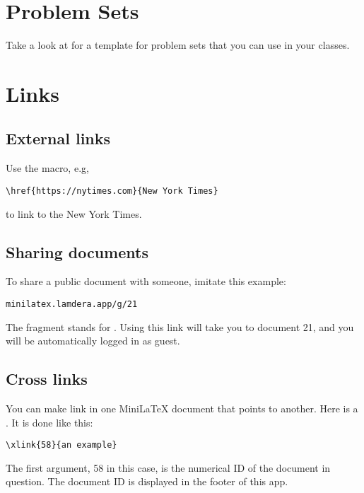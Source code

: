\section{Problem Sets}

Take a look at  for a template for problem sets that you can use in your classes.

\section{Links}

\subsection{External links}

Use the  macro, e.g,

\begin{verbatim}
\href{https://nytimes.com}{New York Times}
\end{verbatim}

to link to the New York Times.

\subsection{Sharing documents}

To share a public document with someone, imitate this example:

\begin{verbatim}
minilatex.lamdera.app/g/21
\end{verbatim}

The  fragment  stands for .  Using this link will take you to document 21, and you will be automatically logged in as guest.


\subsection{Cross links}

You can make link in one MiniLaTeX document that points to another.
Here is a . It is done like this:

\begin{verbatim}
\xlink{58}{an example}
\end{verbatim}

The first argument, 58 in this case, is the numerical ID of the document in question. The document ID is displayed in the footer of this app.

